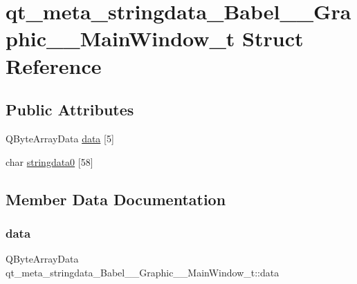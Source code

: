 \hypertarget{structqt__meta__stringdata__Babel____Graphic____MainWindow__t}{}\section{qt\+\_\+meta\+\_\+stringdata\+\_\+\+Babel\+\_\+\+\_\+\+Graphic\+\_\+\+\_\+\+Main\+Window\+\_\+t Struct Reference}
\label{structqt__meta__stringdata__Babel____Graphic____MainWindow__t}
\subsection*{Public Attributes}
\begin{DoxyCompactItemize}
\item 
Q\+Byte\+Array\+Data \hyperlink{structqt__meta__stringdata__Babel____Graphic____MainWindow__t_a71ca426cc7726ca4eba29cdc56bf31fb}{data} \mbox{[}5\mbox{]}
\item 
char \hyperlink{structqt__meta__stringdata__Babel____Graphic____MainWindow__t_a04432d5f54db70561633976795caa849}{stringdata0} \mbox{[}58\mbox{]}
\end{DoxyCompactItemize}


\subsection{Member Data Documentation}
\mbox{\label{structqt__meta__stringdata__Babel____Graphic____MainWindow__t_a71ca426cc7726ca4eba29cdc56bf31fb}} 
\subsubsection{\texorpdfstring{data}{data}}
{\footnotesize\ttfamily Q\+Byte\+Array\+Data qt\+\_\+meta\+\_\+stringdata\+\_\+\+Babel\+\_\+\+\_\+\+Graphic\+\_\+\+\_\+\+Main\+Window\+\_\+t\+::data}

